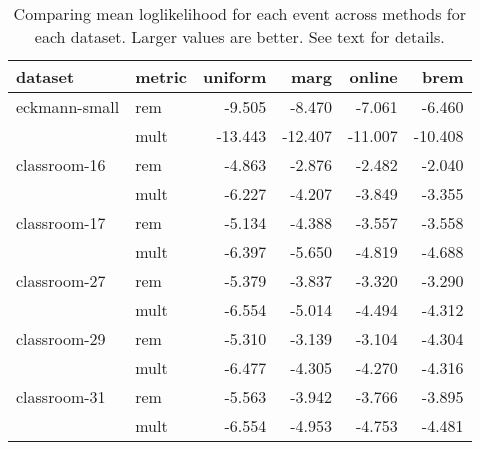 \begin{table}[t]
\begin{center}
{\footnotesize
\begin{tabular}{llrrrr}
  \hline
dataset & metric & uniform & marg & online & brem \\ 
  \hline
eckmann-small & rem & -9.505 & -8.470 & -7.061 & -6.460 \\ 
   & mult & -13.443 & -12.407 & -11.007 & -10.408 \\ 
  classroom-16 & rem & -4.863 & -2.876 & -2.482 & -2.040 \\ 
   & mult & -6.227 & -4.207 & -3.849 & -3.355 \\ 
  classroom-17 & rem & -5.134 & -4.388 & -3.557 & -3.558 \\ 
   & mult & -6.397 & -5.650 & -4.819 & -4.688 \\ 
  classroom-27 & rem & -5.379 & -3.837 & -3.320 & -3.290 \\ 
   & mult & -6.554 & -5.014 & -4.494 & -4.312 \\ 
  classroom-29 & rem & -5.310 & -3.139 & -3.104 & -4.304 \\ 
   & mult & -6.477 & -4.305 & -4.270 & -4.316 \\ 
  classroom-31 & rem & -5.563 & -3.942 & -3.766 & -3.895 \\ 
   & mult & -6.554 & -4.953 & -4.753 & -4.481 \\ 
   \hline
\end{tabular}
}
\caption{Comparing mean loglikelihood for each event across methods for each dataset.  Larger values are better.  See text for details.}
\label{tab:results}
\end{center}
\end{table}
